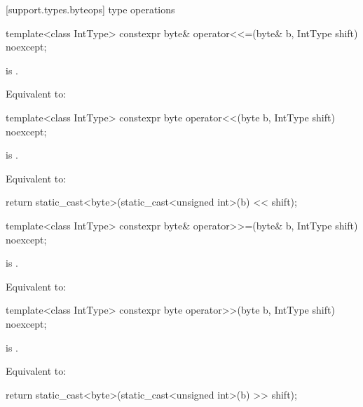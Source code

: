 [support.types.byteops]{ type operations}

%
\begin{itemdecl}
template<class IntType>
  constexpr byte& operator<<=(byte& b, IntType shift) noexcept;
\end{itemdecl}

\begin{itemdescr}
\pnum
\constraints
{} is .

\pnum
\effects
Equivalent to:
\end{itemdescr}

%
\begin{itemdecl}
template<class IntType>
  constexpr byte operator<<(byte b, IntType shift) noexcept;
\end{itemdecl}

\begin{itemdescr}
\pnum
\constraints
{} is .

\pnum
\effects
Equivalent to:
\begin{codeblock}
return static_cast<byte>(static_cast<unsigned int>(b) << shift);
\end{codeblock}
\end{itemdescr}

%
\begin{itemdecl}
template<class IntType>
  constexpr byte& operator>>=(byte& b, IntType shift) noexcept;
\end{itemdecl}

\begin{itemdescr}
\pnum
\constraints
{} is .

\pnum
\effects
Equivalent to:
\end{itemdescr}

%
\begin{itemdecl}
template<class IntType>
  constexpr byte operator>>(byte b, IntType shift) noexcept;
\end{itemdecl}

\begin{itemdescr}
\pnum
\constraints
{} is .

\pnum
\effects
Equivalent to:
\begin{codeblock}
return static_cast<byte>(static_cast<unsigned int>(b) >> shift);
\end{codeblock}
\end{itemdescr}

